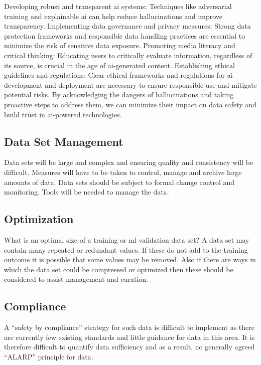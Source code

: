 \begin{aibox}
Developing robust and transparent \gls{ai} systems: Techniques like adversarial training and explainable \gls{ai} can help reduce hallucinations and improve transparency.
Implementing data governance and privacy measures: Strong data protection frameworks and responsible data handling practices are essential to minimize the risk of sensitive data exposure.
Promoting media literacy and critical thinking: Educating users to critically evaluate \gls{information}, regardless of its source, is crucial in the age of \gls{ai}-generated content.
Establishing ethical guidelines and regulations: Clear ethical frameworks and regulations for \gls{ai} development and deployment are necessary to ensure responsible use and mitigate potential risks.
By acknowledging the dangers of hallucinations and taking proactive steps to address them, we can minimize their impact on data safety and build trust in \gls{ai}-powered technologies.
\end{aibox}

\subsection{Data Set Management}
Data sets will be large and complex and ensuring quality and \gls{consistency} will be difficult. Measures will have to be taken to control, manage and archive large amounts of data. Data sets should be subject to formal change control and monitoring. Tools will be needed to manage the data.

\subsection{Optimization}
What is an optimal size of a training or
\gls{ml}
validation data set? A data set may contain many repeated or redundant values. If these do not add to the training outcome it is possible that some values may be removed. Also if there are ways in which the data set could be compressed or optimized then these should be considered to assist management and curation.

\subsection{Compliance}
A ``safety by compliance'' strategy for such data is difficult to implement as there are currently
few existing standards and little guidance for data in this area.
It is therefore difficult to quantify data sufficiency and as a result, no generally agreed ``ALARP'' principle for data.

